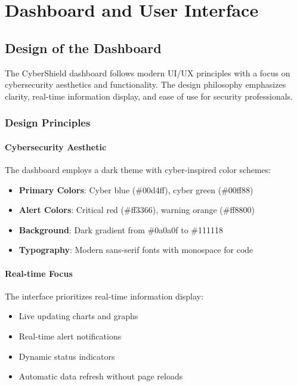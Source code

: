 \documentclass[12pt,a4paper]{report}
\begin{document}
\chapter{Dashboard and User Interface}

\section{Design of the Dashboard}

The CyberShield dashboard follows modern UI/UX principles with a focus on cybersecurity aesthetics and functionality. The design philosophy emphasizes clarity, real-time information display, and ease of use for security professionals.

\subsection{Design Principles}

\subsubsection{Cybersecurity Aesthetic}
The dashboard employs a dark theme with cyber-inspired color schemes:
\begin{itemize}
    \item \textbf{Primary Colors}: Cyber blue (\#00d4ff), cyber green (\#00ff88)
    \item \textbf{Alert Colors}: Critical red (\#ff3366), warning orange (\#ff8800)
    \item \textbf{Background}: Dark gradient from \#0a0a0f to \#111118
    \item \textbf{Typography}: Modern sans-serif fonts with monospace for code
\end{itemize}

\subsubsection{Real-time Focus}
The interface prioritizes real-time information display:
\begin{itemize}
    \item Live updating charts and graphs
    \item Real-time alert notifications
    \item Dynamic status indicators
    \item Automatic data refresh without page reloads
\end{itemize}
\end{document}
